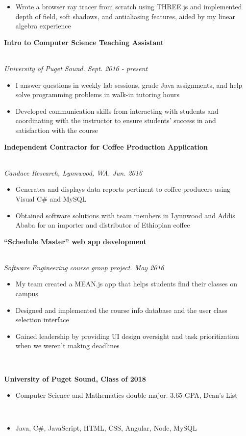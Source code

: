\documentclass[11pt]{article}
\newcommand\phv{\fontfamily{phv}\selectfont}
\begin{document}
\begin{itemize}
	\item Wrote a browser ray tracer from scratch using THREE.js and implemented depth of field, soft shadows, and antialiasing features, aided by my linear algebra experience
\end{itemize}
\noindent \centerline{\large \bf Intro to Computer Science Teaching Assistant \hfill }
\\\emph{University of Puget Sound. Sept. 2016 - present}
\begin{itemize}
  \item I answer questions in weekly lab sessions, grade Java assignments, and help solve programming problems in walk-in tutoring hours
  \item Developed communication skills from interacting with students and coordinating with the instructor to ensure students' success in and satisfaction with the course
\end{itemize}
\noindent \centerline{\large \bf Independent Contractor for Coffee Production Application \hfill }
\\\emph{Candace Research, Lynnwood, WA. Jun. 2016}
\begin{itemize}
  \item Generates and displays data reports pertinent to coffee producers using Visual C\# and MySQL
  \item Obtained software solutions with team members in Lynnwood and Addis Ababa for an importer and distributor of Ethiopian coffee
\end{itemize}
\noindent \centerline{\large \bf ``Schedule Master'' web app development \hfill }
\\\emph{Software Engineering course group project. May 2016}
\begin{itemize}
  \item My team created a MEAN.js app that helps students find their classes on campus
  \item Designed and implemented the course info database and the user class selection interface
  \item Gained leadership by providing UI design oversight and task prioritization when we weren't making deadlines
\end{itemize}
\noindent{\LARGE \bf \phv{Education}  } \medskip \\
\noindent \centerline{\large \bf University of Puget Sound, Class of 2018 \hfill }
\begin{itemize}
  \item Computer Science and Mathematics double major. 3.65 GPA, Dean's List
\end{itemize}
\noindent{\Large \bf \phv{Technology Summary}} \medskip \\
\begin{itemize}
  \item Java, C\#, JavaScript, HTML, CSS, Angular, Node, MySQL
\end{itemize}
\end{document}
